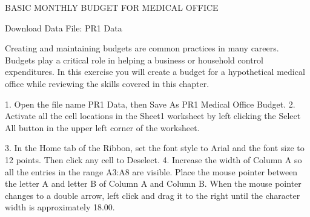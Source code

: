 BASIC MONTHLY BUDGET FOR MEDICAL OFFICE

Download Data File: PR1 Data

Creating and maintaining budgets are common practices in many careers. Budgets play a critical role
in helping a business or household control expenditures. In this exercise you will create a budget for
a hypothetical medical office while reviewing the skills covered in this chapter.

1. Open the file name PR1 Data, then Save As PR1 Medical Office Budget.
2. Activate all the cell locations in the Sheet1 worksheet by left clicking the Select All button in the
upper left corner of the worksheet.




3. In the Home tab of the Ribbon, set the font style to Arial and the font size to 12 points. Then
click any cell to Deselect.
4. Increase the width of Column A so all the entries in the range A3:A8 are visible. Place the mouse
pointer between the letter A and letter B of Column A and Column B. When the mouse pointer
changes to a double arrow, left click and drag it to the right until the character width is
approximately 18.00.


